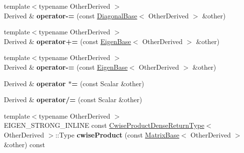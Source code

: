 \begin{DoxyCompactItemize}
\mbox{\label{class_eigen_1_1_sparse_matrix_base_add975d4d76424b294d8a922b5986841d}} 
{\footnotesize template$<$typename Other\+Derived $>$ }\\Derived \& {\bfseries operator-\/=} (const \mbox{\hyperlink{class_eigen_1_1_diagonal_base}{Diagonal\+Base}}$<$ Other\+Derived $>$ \&other)
\item 
\mbox{\label{class_eigen_1_1_sparse_matrix_base_abb933a5c577a6df270333d3382c81b3d}} 
{\footnotesize template$<$typename Other\+Derived $>$ }\\Derived \& {\bfseries operator+=} (const \mbox{\hyperlink{struct_eigen_1_1_eigen_base}{Eigen\+Base}}$<$ Other\+Derived $>$ \&other)
\item 
\mbox{\label{class_eigen_1_1_sparse_matrix_base_a212acb1c602880bdea2732014d29ce3a}} 
{\footnotesize template$<$typename Other\+Derived $>$ }\\Derived \& {\bfseries operator-\/=} (const \mbox{\hyperlink{struct_eigen_1_1_eigen_base}{Eigen\+Base}}$<$ Other\+Derived $>$ \&other)
\item 
\mbox{\label{class_eigen_1_1_sparse_matrix_base_acfa0a007169fcdf8635a01d94a09686f}} 
Derived \& {\bfseries operator $\ast$=} (const Scalar \&other)
\item 
\mbox{\label{class_eigen_1_1_sparse_matrix_base_adcf52365cb9d032d3968c809fd3d5ea5}} 
Derived \& {\bfseries operator/=} (const Scalar \&other)
\item 
\mbox{\label{class_eigen_1_1_sparse_matrix_base_a94d8fe22984eb80587e484c1d54b4efd}} 
{\footnotesize template$<$typename Other\+Derived $>$ }\\E\+I\+G\+E\+N\+\_\+\+S\+T\+R\+O\+N\+G\+\_\+\+I\+N\+L\+I\+NE const \mbox{\hyperlink{struct_eigen_1_1_sparse_matrix_base_1_1_cwise_product_dense_return_type}{Cwise\+Product\+Dense\+Return\+Type}}$<$ Other\+Derived $>$\+::Type {\bfseries cwise\+Product} (const \mbox{\hyperlink{class_eigen_1_1_matrix_base}{Matrix\+Base}}$<$ Other\+Derived $>$ \&other) const
\item 
\mbox{\label{class_eigen_1_1_sparse_matrix_base_ac4f004b42b09b3055aa1559c57136c6b}} 

\end{DoxyCompactItemize}
